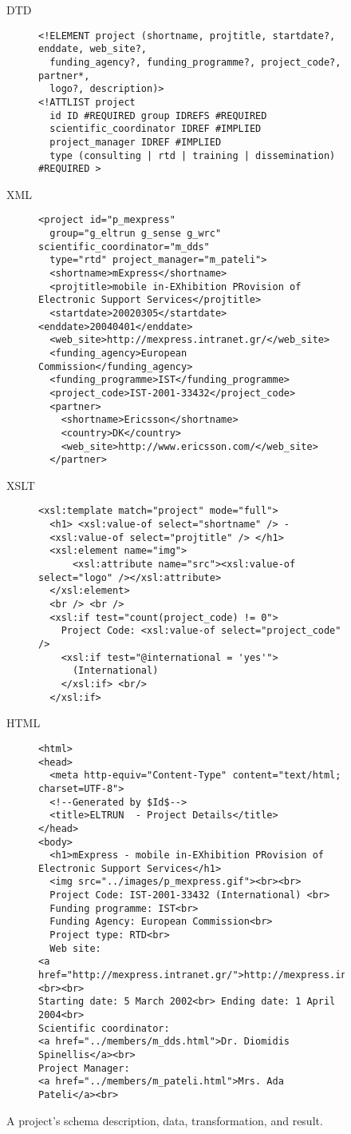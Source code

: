 \documentclass[10pt]{article}
\begin{document}
\begin{figure}
\begin{description}
\item[DTD]
{\small\begin{verbatim}
<!ELEMENT project (shortname, projtitle, startdate?, enddate, web_site?,
  funding_agency?, funding_programme?, project_code?, partner*,
  logo?, description)>
<!ATTLIST project
  id ID #REQUIRED group IDREFS #REQUIRED
  scientific_coordinator IDREF #IMPLIED
  project_manager IDREF #IMPLIED
  type (consulting | rtd | training | dissemination) #REQUIRED >
\end{verbatim}}
\item[XML]
{\small\begin{verbatim}
<project id="p_mexpress"
  group="g_eltrun g_sense g_wrc" scientific_coordinator="m_dds"
  type="rtd" project_manager="m_pateli">
  <shortname>mExpress</shortname>
  <projtitle>mobile in-EXhibition PRovision of Electronic Support Services</projtitle>
  <startdate>20020305</startdate> <enddate>20040401</enddate>
  <web_site>http://mexpress.intranet.gr/</web_site>
  <funding_agency>European Commission</funding_agency>
  <funding_programme>IST</funding_programme>
  <project_code>IST-2001-33432</project_code>
  <partner>
    <shortname>Ericsson</shortname>
    <country>DK</country>
    <web_site>http://www.ericsson.com/</web_site>
  </partner>
\end{verbatim}}
\item[XSLT]
{\small\begin{verbatim}
<xsl:template match="project" mode="full">
  <h1> <xsl:value-of select="shortname" /> -
  <xsl:value-of select="projtitle" /> </h1>
  <xsl:element name="img">
      <xsl:attribute name="src"><xsl:value-of select="logo" /></xsl:attribute>
  </xsl:element>
  <br /> <br />
  <xsl:if test="count(project_code) != 0">
    Project Code: <xsl:value-of select="project_code" />
    <xsl:if test="@international = 'yes'">
      (International)
    </xsl:if> <br/>
  </xsl:if>
\end{verbatim}}
\item[HTML]
{\small\begin{verbatim}
<html>
<head>
  <meta http-equiv="Content-Type" content="text/html; charset=UTF-8">
  <!--Generated by $Id$-->
  <title>ELTRUN  - Project Details</title>
</head>
<body>
  <h1>mExpress - mobile in-EXhibition PRovision of Electronic Support Services</h1>
  <img src="../images/p_mexpress.gif"><br><br>
  Project Code: IST-2001-33432 (International) <br>
  Funding programme: IST<br>
  Funding Agency: European Commission<br>
  Project type: RTD<br>
  Web site:
<a href="http://mexpress.intranet.gr/">http://mexpress.intranet.gr/</a><br><br>
Starting date: 5 March 2002<br> Ending date: 1 April 2004<br>
Scientific coordinator:
<a href="../members/m_dds.html">Dr. Diomidis Spinellis</a><br>
Project Manager:
<a href="../members/m_pateli.html">Mrs. Ada Pateli</a><br>
\end{verbatim}}
\end{description}
\caption{
\label{fig:proj}
A project's schema description, data, transformation, and result.}
\end{figure}
\end{document}
